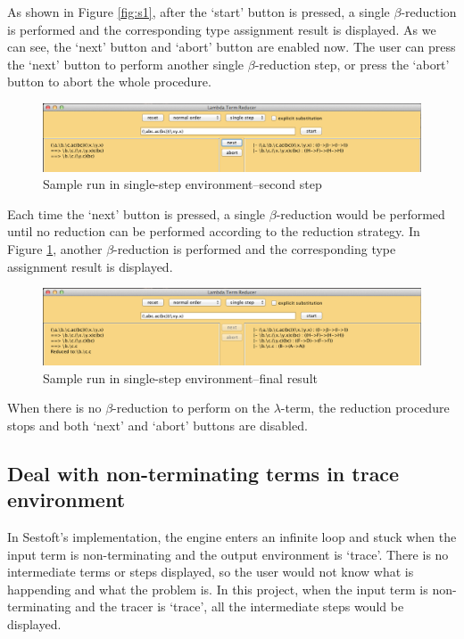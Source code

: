 As shown in Figure \ref{fig:s1}, after the `start' button is pressed, a single $\beta$-reduction is performed and the corresponding type assignment result is displayed. As we can see, the `next' button and `abort' button are enabled now. The user can press the `next' button to perform another single $\beta$-reduction step, or press the `abort' button to abort the whole procedure.  

\begin{figure}[ht]
\centering
\includegraphics[width=\textwidth]{pics/single2}
\caption{Sample run in single-step environment--second step}
\label{fig:s2}
\end{figure}

Each time the `next' button is pressed, a single $\beta$-reduction would be performed until no reduction can be performed according to the reduction strategy. In Figure \ref{fig:s2}, another $\beta$-reduction is performed and the corresponding type assignment result is displayed. 

\begin{figure}[ht]
\centering
\includegraphics[width=\textwidth]{pics/single3}
\caption{Sample run in single-step environment--final result}
\label{fig:s3}
\end{figure}

When there is no $\beta$-reduction to perform on the $\lambda$-term, the reduction procedure stops and both `next' and `abort' buttons are disabled.

\subsection{Deal with non-terminating terms in trace environment}

In Sestoft's implementation, the engine enters an infinite loop and stuck when the input term is non-terminating and the output environment is `trace'. There is no intermediate terms or steps displayed, so the user would not know what is happending and what the problem is. In this project, when the input term is non-terminating and the tracer is `trace', all the intermediate steps would be displayed.   


